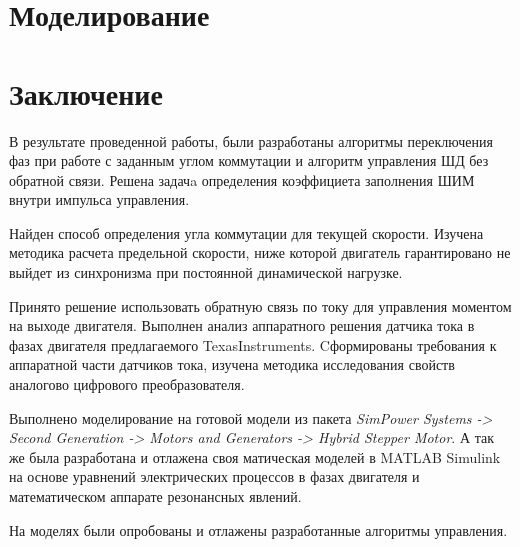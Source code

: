 \documentclass{article}
\begin{document}
\newpage





\newpage
\section{Моделирование}


\newpage



\newpage
\section{Заключение}

В результате проведенной работы, были разработаны алгоритмы переключения фаз при
работе с заданным углом коммутации и алгоритм управления ШД без обратной связи.
Решена задачa определения коэффициета заполнения ШИМ внутри импульса
управления.

Найден способ определения угла коммутации для текущей скорости. Изучена методика
расчета предельной скорости, ниже которой двигатель гарантировано не выйдет из
синхронизма при постоянной динамической нагрузке.

Принято решение использовать обратную связь по току для управления моментом на
выходе двигателя. Выполнен анализ аппаратного решения датчика тока в фазах двигателя
предлагаемого TexasInstruments. Cформированы требования к аппаратной части датчиков
тока, изучена методика исследования свойств аналогово цифрового преобразователя.

Выполнено моделирование на готовой модели из пакета
\textit{SimPower Systems -> Second Generation -> Motors and Generators -> Hybrid Stepper Motor}.
А так же была разработана и отлажена своя матическая моделей в MATLAB Simulink на основе
уравнений электрических процессов в фазах двигателя и математическом аппарате резонансных явлений.

На моделях были опробованы и отлажены разработанные алгоритмы управления.


\end{document}
